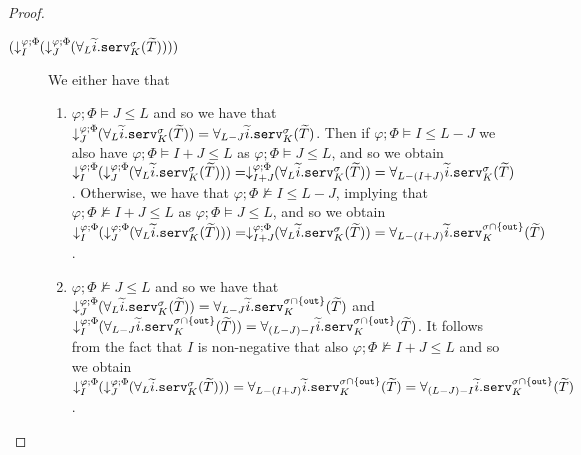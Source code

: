 \begin{lemma}
\begin{proof}
\begin{description}
\begin{enumerate}
    \end{enumerate}
    \item[$(\susume{\susume{\forall_L\widetilde{i}.\texttt{serv}^\sigma_K(\widetilde{T})}{\varphi}{\Phi}{J}}{\varphi}{\Phi}{I})$] We either have that
    \begin{enumerate}
        \item $\varphi;\Phi\vDash J \leq L$ and so we have that $\susume{\forall_L\widetilde{i}.\texttt{serv}^\sigma_K(\widetilde{T})}{\varphi}{\Phi}{J}=\forall_{L-J}\widetilde{i}.\texttt{serv}^\sigma_K(\widetilde{T})$. Then if $\varphi;\Phi\vDash I \leq L-J$ we also have $\varphi;\Phi\vDash I+J \leq L$ as $\varphi;\Phi\vDash J \leq L$, and so we obtain $\susume{\susume{\forall_L\widetilde{i}.\texttt{serv}^\sigma_K(\widetilde{T})}{\varphi}{\Phi}{J}}{\varphi}{\Phi}{I}=\susume{\forall_L\widetilde{i}.\texttt{serv}^\sigma_K(\widetilde{T})}{\varphi}{\Phi}{I+J}=\forall_{L-(I+J)}\widetilde{i}.\texttt{serv}^\sigma_K(\widetilde{T})$. Otherwise, we have that $\varphi;\Phi\nvDash I \leq L-J$, implying that $\varphi;\Phi\nvDash I+J \leq L$ as $\varphi;\Phi\vDash J \leq L$, and so we obtain $\susume{\susume{\forall_L\widetilde{i}.\texttt{serv}^\sigma_K(\widetilde{T})}{\varphi}{\Phi}{J}}{\varphi}{\Phi}{I}=\susume{\forall_L\widetilde{i}.\texttt{serv}^\sigma_K(\widetilde{T})}{\varphi}{\Phi}{I+J}=\forall_{L-(I+J)}\widetilde{i}.\texttt{serv}^{\sigma\cap\{\texttt{out}\}}_K(\widetilde{T})$.
        \item $\varphi;\Phi\nvDash J \leq L$ and so we have that $\susume{\forall_L\widetilde{i}.\texttt{serv}^\sigma_K(\widetilde{T})}{\varphi}{\Phi}{J}=\forall_{L-J}\widetilde{i}.\texttt{serv}^{\sigma\cap\{\texttt{out}\}}_K(\widetilde{T})$ and $\susume{\forall_{L-J}\widetilde{i}.\texttt{serv}^{\sigma\cap\{\texttt{out}\}}_K(\widetilde{T})}{\varphi}{\Phi}{I}=\forall_{(L-J)-I}\widetilde{i}.\texttt{serv}^{\sigma\cap\{\texttt{out}\}}_K(\widetilde{T})$. It follows from the fact that $I$ is non-negative that also $\varphi;\Phi\nvDash I+J \leq L$ and so we obtain $\susume{\susume{\forall_L\widetilde{i}.\texttt{serv}^\sigma_K(\widetilde{T})}{\varphi}{\Phi}{J}}{\varphi}{\Phi}{I}=\forall_{L-(I+J)}\widetilde{i}.\texttt{serv}^{\sigma\cap\{\texttt{out}\}}_K(\widetilde{T})=\forall_{(L-J)-I}\widetilde{i}.\texttt{serv}^{\sigma\cap\{\texttt{out}\}}_K(\widetilde{T})$.
    \end{enumerate}
    \end{description}
\end{proof}
\end{lemma}
%

